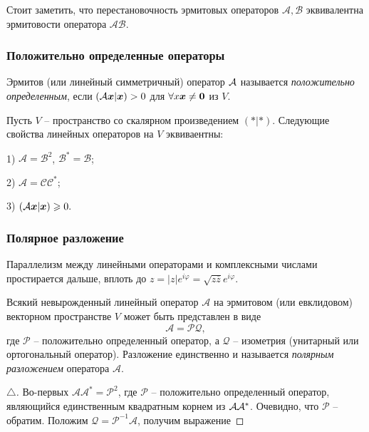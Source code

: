 Стоит заметить, что перестановочность эрмитовых операторов $\mathcal A, \mathcal B$ эквивалентна эрмитовости оператора $\mathcal{AB}$. 


\subsubsection{Положительно определенные операторы}
\begin{to_def} 
    Эрмитов (или линейный симметричный) оператор $\mathcal A$ называется \textit{положительно определенным}, если $(\mathcal A \mbox{\boldmath $x$} | \mbox{\boldmath $x$}) > 0$ для $\forall x\mbox{\boldmath $x$} \neq \mbox{\boldmath $0$}$ из $V$. 
\end{to_def}


\begin{to_thr} 
    Пусть $V$ -- пространство со скалярном произведением $(*|*)$. Следующие свойства линейных операторов на $V$ эквиваентны:

    1) $\mathcal A = \mathcal B^2$, $\mathcal B^* = \mathcal B$;

    2) $\mathcal A = \mathcal C \mathcal C^*$;

    3) $(\mathcal A \mbox{\boldmath $x$} | \mbox{\boldmath $x$}) \geqslant 0.$
\end{to_thr}


\subsubsection{Полярное разложение}

Параллелизм между линейными операторами и комплексными числами простирается дальше, вплоть до $z = |z| e^{i \varphi} = \sqrt{z \overline{z}} e^{i \varphi}$.

\begin{to_thr} 
    Всякий невырожденный линейный оператор $\mathcal A$ на эрмитовом (или евклидовом) векторном пространстве $V$ может быть представлен в виде 
    \begin{equation}
    \label{qp}
        \mathcal A = \mathcal P \mathcal Q,
    \end{equation}
    где $\mathcal P$ -- положительно определенный оператор, а $\mathcal Q$ -- изометрия (унитарный или ортогональный оператор). Разложение единственно и называется \textit{полярным разложением} оператора $\mathcal A.$ 
\end{to_thr}


\begin{proof}[$\triangle$]
    Во-первых $\mathcal A \mathcal A^* = \mathcal P^2$, где $\mathcal P$ -- положительно определенный оператор, являющийся единственным квадратным корнем из $\mathcal A \mathcal A^*$. Очевидно, что $\mathcal P$ -- обратим. Положим $\mathcal Q = \mathcal P^{-1} \mathcal A$, получим выражение 
\end{proof}


